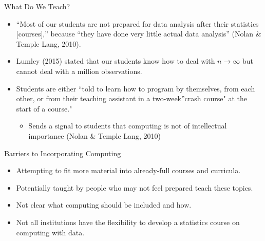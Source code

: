 \documentclass[10pt,ignorenonframetext,]{beamer}
\providecommand{\tightlist}{%
  \setlength{\itemsep}{0pt}\setlength{\parskip}{0pt}}
\begin{document}
\begin{frame}{What Do We Teach?}

\begin{itemize}[<+->]
\item
  ``Most of our students are not prepared for data analysis after their
  statistics {[}courses{]},'' because ``they have done very little
  actual data analysis'' (Nolan \& Temple Lang, 2010).\\
\item
  Lumley (2015) stated that our students know how to deal with
  \(n \to \infty\) but cannot deal with a million observations.
\item
  Students are either ``told to learn how to program by themselves, from
  each other, or from their teaching assistant in a two-week''crash
  course" at the start of a course."

  \begin{itemize}[<+->]
  \tightlist
  \item
    Sends a signal to students that computing is not of intellectual
    importance (Nolan \& Temple Lang, 2010)
  \end{itemize}
\end{itemize}

\end{frame}

\begin{frame}{Barriers to Incorporating Computing}

\begin{itemize}[<+->]
\item
  Attempting to fit more material into already-full courses and
  curricula.
\item
  Potentially taught by people who may not feel prepared teach these
  topics.
\item
  Not clear what computing should be included and how.
\item
  Not all institutions have the flexibility to develop a statistics
  course on computing with data.
\end{itemize}

\end{frame}
\end{document}
